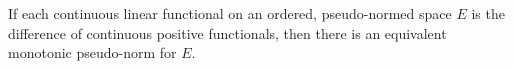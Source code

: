 If each continuous linear functional on an ordered, pseudo-normed space $E$ is the difference of continuous positive functionals, then there is an equivalent monotonic pseudo-norm for $E$.

